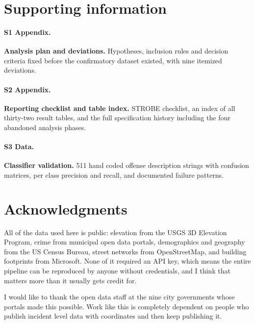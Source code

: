 \documentclass[10pt,letterpaper]{article}
\begin{document}
\section*{Supporting information}

\paragraph*{S1 Appendix.} {\bf Analysis plan and deviations.} Hypotheses, inclusion
rules and decision criteria fixed before the confirmatory dataset existed, with nine
itemized deviations.

\paragraph*{S2 Appendix.} {\bf Reporting checklist and table index.} STROBE checklist,
an index of all thirty-two result tables, and the full specification history including
the four abandoned analysis phases.

\paragraph*{S3 Data.} {\bf Classifier validation.} 511 hand coded offense description
strings with confusion matrices, per class precision and recall, and documented
failure patterns.

\section*{Acknowledgments}

All of the data used here is public: elevation from the USGS 3D Elevation Program,
crime from municipal open data portals, demographics and geography from the US Census
Bureau, street networks from OpenStreetMap, and building footprints from Microsoft.
None of it required an API key, which means the entire pipeline can be reproduced by
anyone without credentials, and I think that matters more than it usually gets credit
for.

I would like to thank the open data staff at the nine city governments whose portals
made this possible. Work like this is completely dependent on people who publish
incident level data with coordinates and then keep publishing it.
\end{document}
